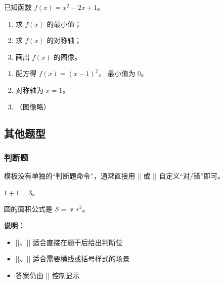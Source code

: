 \begin{latexcode}
  \begin{problem}[points = 12]
    已知函数 $f(x) = x^2 - 2x + 1$。
    \begin{enumerate}
      \item 求 $f(x)$ 的最小值；
      \item 求 $f(x)$ 的对称轴；
      \item 画出 $f(x)$ 的图像。
    \end{enumerate}

    \begin{solution}
      \begin{enumerate}
        \item 配方得 $f(x) = (x-1)^2$，
              最小值为 $0$。
        \item 对称轴为 $x = 1$。
        \item （图像略）
      \end{enumerate}
    \end{solution}
  \end{problem}
\end{latexcode}


\subsection{其他题型}

\subsubsection{判断题}

模板没有单独的“判断题命令”，通常直接用 |\paren| 或 |\fillin| 自定义“对/错”即可。

\begin{latexcode}
  \begin{question}
    $1 + 1 = 3$。\paren[错]
  \end{question}

  \begin{question}
    圆的面积公式是 $S = \uppi r^2$。\fillin[对]
  \end{question}
\end{latexcode}

\textbf{说明：}
\begin{itemize}
  \item |\paren[对]|、|\paren[错]| 适合直接在题干后给出判断位
  \item |\fillin[对]|、|\fillin[错]| 适合需要横线或括号样式的场景
  \item 答案仍由 || 控制显示
\end{itemize}


